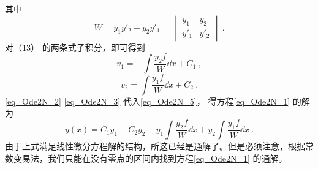 其中
\begin{equation}
W = y_1 y'_2 - y_2 y'_1 = 
\begin{vmatrix}
y_1 & y_2\\
y'_1 & y'_2
\end{vmatrix}~.
\end{equation}
对（13）%
的两条式子积分，即可得到
\begin{equation}\label{eq_Ode2N_2}
v_1 =  - \int \frac{y_2 f}{W} \dd{x}  + C_1~,
\end{equation}
\begin{equation}\label{eq_Ode2N_3}
v_2 = \int \frac{y_1 f}{W} \dd{x}  + C_2~.
\end{equation}
\autoref{eq_Ode2N_2} \autoref{eq_Ode2N_3} 代入\autoref{eq_Ode2N_5}， 得方程\autoref{eq_Ode2N_1} 的解为
\begin{equation}
y(x) = C_1 y_1 + C_2 y_2 - y_1 \int \frac{y_2 f}{W} \dd{x} + y_2 \int \frac{y_1 f}{W} \dd{x}~.
\end{equation}
由于上式满足线性微分方程解的结构，所这已经是通解了。但是必须注意，根据常数变易法，我们只能在没有零点的区间内找到方程\autoref{eq_Ode2N_1} 的通解。
